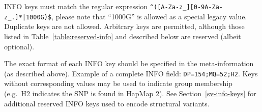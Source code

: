 \documentclass[8pt]{article}
\begin{document}
\begin{enumerate}
  INFO keys must match the regular expression \texttt{\^{}([A-Za-z\_][0-9A-Za-z\_.]*|1000G)\$}, please note that ``1000G'' is allowed as a special legacy value.
  Duplicate keys are not allowed.
  Arbitrary keys are permitted, although those listed in Table~\ref{table:reserved-info} and described below are reserved (albeit optional).

  The exact format of each INFO key should be specified in the meta-information (as described above).
  Example of a complete INFO field: {\tt DP=154;MQ=52;H2}.
  Keys without corresponding values may be used to indicate group membership (e.g.\ H2 indicates the SNP is found in HapMap 2).
  See Section~\ref{sv-info-keys} for additional reserved INFO keys used to encode structural variants.
\end{enumerate}
\end{document}
